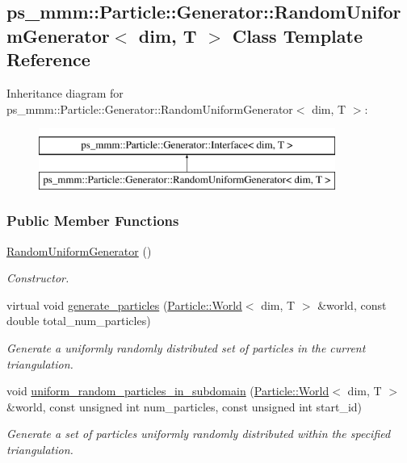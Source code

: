 \hypertarget{classps__mmm_1_1_particle_1_1_generator_1_1_random_uniform_generator}{}\subsection{ps\+\_\+mmm\+:\+:Particle\+:\+:Generator\+:\+:Random\+Uniform\+Generator$<$ dim, T $>$ Class Template Reference}
\label{classps__mmm_1_1_particle_1_1_generator_1_1_random_uniform_generator}
Inheritance diagram for ps\+\_\+mmm\+:\+:Particle\+:\+:Generator\+:\+:Random\+Uniform\+Generator$<$ dim, T $>$\+:\begin{figure}[H]
\begin{center}
\leavevmode
\includegraphics[height=2.000000cm]{classps__mmm_1_1_particle_1_1_generator_1_1_random_uniform_generator}
\end{center}
\end{figure}
\subsubsection*{Public Member Functions}
\begin{DoxyCompactItemize}
\item 
\hyperlink{classps__mmm_1_1_particle_1_1_generator_1_1_random_uniform_generator_a583230a57623763138135b4268fcc938}{Random\+Uniform\+Generator} ()
\begin{DoxyCompactList}\small\item\em Constructor. \end{DoxyCompactList}\item 
virtual void \hyperlink{classps__mmm_1_1_particle_1_1_generator_1_1_random_uniform_generator_acab198ee19a6972e015fce1f472349d9}{generate\+\_\+particles} (\hyperlink{classps__mmm_1_1_particle_1_1_world}{Particle\+::\+World}$<$ dim, T $>$ \&world, const double total\+\_\+num\+\_\+particles)
\begin{DoxyCompactList}\small\item\em Generate a uniformly randomly distributed set of particles in the current triangulation. \end{DoxyCompactList}\item 
void \hyperlink{classps__mmm_1_1_particle_1_1_generator_1_1_random_uniform_generator_a4f66c5035c5af52f15228265aa5d1457}{uniform\+\_\+random\+\_\+particles\+\_\+in\+\_\+subdomain} (\hyperlink{classps__mmm_1_1_particle_1_1_world}{Particle\+::\+World}$<$ dim, T $>$ \&world, const unsigned int num\+\_\+particles, const unsigned int start\+\_\+id)
\begin{DoxyCompactList}\small\item\em Generate a set of particles uniformly randomly distributed within the specified triangulation. \end{DoxyCompactList}\end{DoxyCompactItemize}


